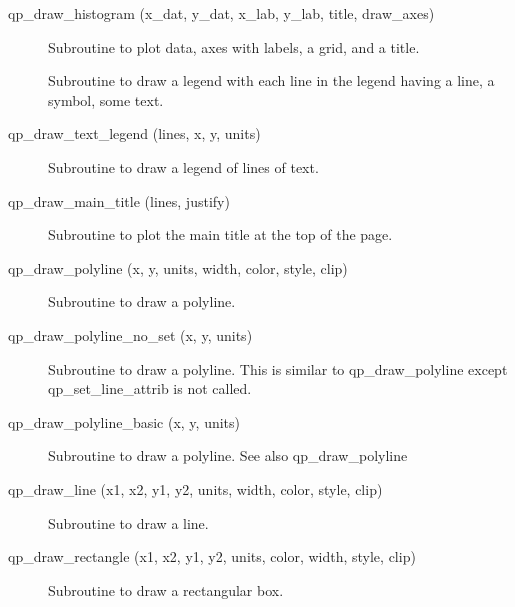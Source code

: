 \begin{description}
\label{r:qp.draw.histogram}
\item[qp_draw_histogram (x_dat, y_dat, x_lab, y_lab, title, draw_axes)] \Newline 
     Subroutine to plot data, axes with labels, a grid, and a title.

\label{r:qp.draw.curve.legend}
\item[\protect\parbox{6in}{qp_draw_curve_legend (origin, text_offset, line_length, \\ 
\hspace*{2in}  line, symbol, text, draw_line, draw_symbol, draw_text) }] \Newline
Subroutine to draw a legend with each line in the legend having
  a line, a symbol, some text.

\label{r:qp.draw.text.legend}
\item[qp_draw_text_legend (lines, x, y, units)] \Newline 
Subroutine to draw a legend of lines of text.

\label{r:qp.draw.main.title}
\item[qp_draw_main_title (lines, justify)] \Newline 
     Subroutine to plot the main title at the top of the page.

\label{r:qp.draw.polyline}
\item[qp_draw_polyline (x, y, units, width, color, style, clip)] \Newline 
     Subroutine to draw a polyline.

\label{r:qp.draw.polyline.no.set}
\item[qp_draw_polyline_no_set (x, y, units)] \Newline 
Subroutine to draw a polyline.
This is similar to qp_draw_polyline except qp_set_line_attrib is not called.

\label{r:qp.draw.polyline.basic}
\item[qp_draw_polyline_basic (x, y, units) ] \Newline 
     Subroutine to draw a polyline. See also qp_draw_polyline

\label{r:qp.draw.line}
\item[qp_draw_line (x1, x2, y1, y2, units, width, color, style, clip)] \Newline 
     Subroutine to draw a line.

\label{r:qp.draw.rectangle}
\item[qp_draw_rectangle (x1, x2, y1, y2, units, color, width, style, clip) ] \Newline 
     Subroutine to draw a rectangular box.


\end{description}
